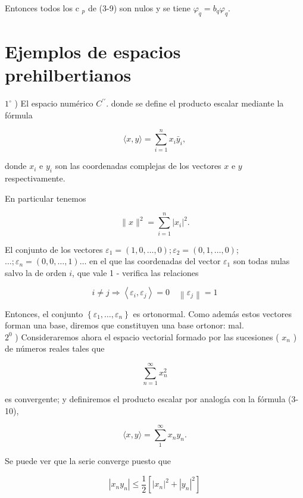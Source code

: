 \documentclass[10pt]{article}
\theoremstyle{plain}
\theoremstyle{definition}
\theoremstyle{remark}
\begin{document}
Entonces todos los c ${ }_{p}$ de (3-9) son nulos y se tiene $\varphi_{\dot{q}}=b_{q} \varphi_{q}$.

\section*{Ejemplos de espacios prehilbertianos}
$1^{\circ}$ ) El espacio numérico $C^{\prime \prime}$. donde se define el producto escalar mediante la fórmula



\begin{equation*}
\langle x, y\rangle=\sum_{i=1}^{n} x_{i} \bar{y}_{i}, \tag{$3\cdot10$}
\end{equation*}


donde $x_{i}$ e $y_{i}$ son las coordenadas complejas de los vectores $x$ e $y$ respectivamente.

En particular tenemos


\begin{equation*}
\|x\|^{2}=\sum_{i=1}^{n}\left|x_{i}\right|^{2} . \tag{3•11}
\end{equation*}


El conjunto de los vectores $\varepsilon_{1}=(1,0, \ldots, 0) ; \varepsilon_{2}=(0,1, \ldots, 0)$; $\ldots ; \varepsilon_{n}=(0,0, \ldots, 1) \ldots$ en el que las coordenadas del vector $\varepsilon_{1}$ son todas nulas salvo la de orden $i$, que vale 1 - verifica las relaciones

$$
i \neq j \Rightarrow\left\langle\varepsilon_{i}, \varepsilon_{j}\right\rangle=0 \quad\left\|\varepsilon_{j}\right\|=1
$$

Entonces, el conjunto $\left\{\varepsilon_{1}, \ldots, \varepsilon_{n}\right\}$ es ortonormal. Como además estos vectores forman una base, diremos que constituyen una base ortonor: mal.\\
$2^{0}$ ) Consideraremos ahora el espacio vectorial formado por las sucesiones ( $x_{n}$ ) de números reales tales que

$$
\sum_{n=1}^{\infty} x_{n}^{2}
$$

es convergente; y definiremos el producto escalar por analogía con la fórmula (3-10),


\begin{equation*}
\langle x, y\rangle=\sum_{1}^{\infty} x_{n} y_{n} . \tag{3-12}
\end{equation*}


Se puede ver que la serie converge puesto que

$$
\left|x_{n} y_{n}\right| \leqslant \frac{1}{2}\left[\left|x_{n}\right|^{2}+\left|y_{n}\right|^{2}\right]
$$
\end{document}
